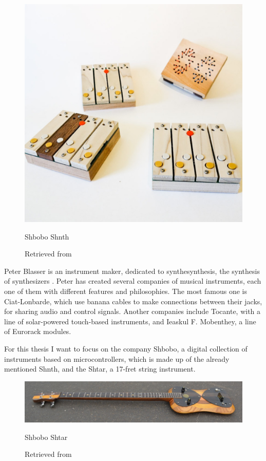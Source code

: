 \begin{figure}[ht]
  \centering
  \includegraphics[width=0.75\linewidth,height=0.25\textheight,keepaspectratio]{images/shbobo-shnth.jpg}
  \caption{Shbobo Shnth}
  \caption*{Retrieved from \cite{website-shbobo-current}}
  \label{fig:shbobo-shnth}
\end{figure}

Peter Blasser is an instrument maker, dedicated to synthesynthesis, the synthesis of synthesizers \cite{blasser2015stores}. Peter has created several companies of musical instruments, each one of them with different features and philosophies. The most famous one is Ciat-Lonbarde, which use banana cables to make connections between their jacks, for sharing audio and control signals. Another companies include Tocante, with a line of solar-powered touch-based instruments, and Ieaskul F. Mobenthey, a line of Eurorack modules.

For this thesis I want to focus on the company Shbobo, a digital collection of instruments based on microcontrollers, which is made up of the already mentioned Shnth, and the Shtar, a 17-fret string instrument.

\begin{figure}[ht]
  \centering
    \includegraphics[width=0.75\linewidth,height=0.25\textheight,keepaspectratio]{images/shbobo-shtar.jpg}
  \caption{Shbobo Shtar}
  \caption*{Retrieved from \cite{website-shbobo-current}}
  \label{fig:shbobo-shtar}
\end{figure}

